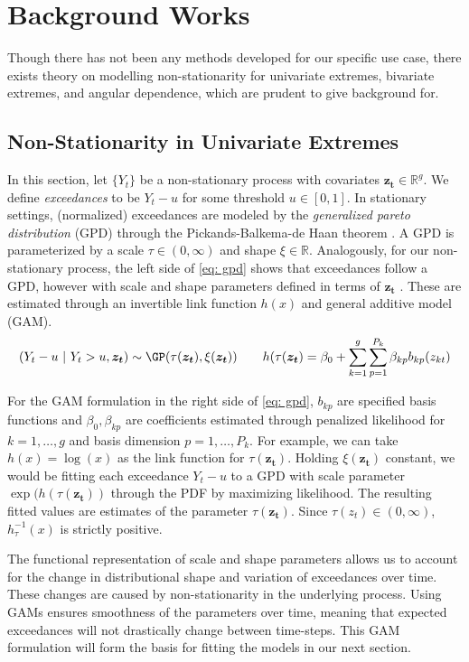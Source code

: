 \documentclass[12pt]{article}
\begin{document}
\section{Background Works}
Though there has not been any methods developed for our specific use case, there exists theory on modelling non-stationarity for univariate extremes, bivariate extremes, and angular dependence, which are prudent to give background for.

  \subsection{Non-Stationarity in Univariate Extremes}
  In this section, let $\{ Y_t \}$ be a non-stationary process with covariates $\boldsymbol{z_t} \in \mathbb{R}^g$.
  We define \textit{exceedances} to be $Y_t - u$ for some threshold $u \in [0, 1]$. In stationary settings, 
  (normalized) exceedances are modeled by the \textit{generalized pareto distribution} (GPD) through the Pickands-Balkema-de Haan theorem \citep{Pickands1981}. A GPD is parameterized by a scale $\tau \in (0, \infty)$ and shape $\xi \in \mathbb{R}$. Analogously, for our non-stationary process, the left side of \cref{eq: gpd} shows that exceedances follow a GPD, however with scale and shape parameters defined in terms of $\boldsymbol{z_t}$ \citep{Youngman2019}. 
  These are estimated through an invertible link function $h(x)$ and general additive model (GAM).
  \begin{equation} \label{eq: gpd}
    (Y_t - u \ |\ Y_t > u, \boldsymbol{z_t}) \sim \GP(\tau(\boldsymbol{z_t}), \xi(\boldsymbol{z_t})) \qquad h(\tau(\boldsymbol{z_t}) = \beta_0 + \sum_{k = 1}^g \sum_{p = 1}^{P_k} \beta_{kp}b_{kp}(z_{kt})
  \end{equation}

  For the GAM formulation in the right side of \cref{eq: gpd}, $b_{kp}$ are specified basis functions and $\beta_0, \beta_{kp}$ are coefficients estimated through penalized likelihood for $k = 1,\dots, g$ and basis dimension $p = 1,\dots, P_k$. 
  For example, we can take $h(x) = \log(x)$ as the link function for $\tau(\boldsymbol{z_t})$. Holding $\xi(\boldsymbol{z_t})$ constant, we would be fitting each exceedance $Y_t - u$ to a GPD with scale parameter $\exp(h(\tau(\boldsymbol{z_t}))$ through the PDF by maximizing likelihood. The resulting fitted values are estimates of the parameter $\tau(\boldsymbol{z_t})$.
  Since $\tau(z_t) \in (0, \infty)$, $h_\tau^{-1}(x)$ is strictly positive. 

  The functional representation of scale and shape parameters allows us to account for the change in distributional shape and variation of exceedances over time. 
  These changes are caused by non-stationarity in the underlying process.
  Using GAMs ensures smoothness of the parameters over time, meaning that expected exceedances will not drastically change between time-steps.
  This GAM formulation will form the basis for fitting the models in our next section.
\end{document}
